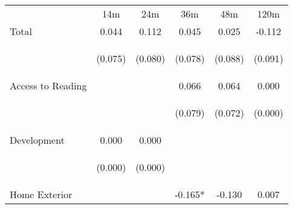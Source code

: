 \begin{tabular}{lccccc}
\hline \noalign{\smallskip} & 14m & 24m & 36m & 48m & 120m\\
\noalign{\smallskip}\hline \noalign{\smallskip}Total & 0.044 & 0.112 & 0.045 & 0.025 & -0.112\\
 & \begin{footnotesize}(0.075)\end{footnotesize} & \begin{footnotesize}(0.080)\end{footnotesize} & \begin{footnotesize}(0.078)\end{footnotesize} & \begin{footnotesize}(0.088)\end{footnotesize} & \begin{footnotesize}(0.091)\end{footnotesize}\\
\noalign{\smallskip}Access to Reading &  &  & 0.066 & 0.064 & 0.000\\
 & \begin{footnotesize}\end{footnotesize} & \begin{footnotesize}\end{footnotesize} & \begin{footnotesize}(0.079)\end{footnotesize} & \begin{footnotesize}(0.072)\end{footnotesize} & \begin{footnotesize}(0.000)\end{footnotesize}\\
\noalign{\smallskip}Development & 0.000 & 0.000 &  &  & \\
 & \begin{footnotesize}(0.000)\end{footnotesize} & \begin{footnotesize}(0.000)\end{footnotesize} & \begin{footnotesize}\end{footnotesize} & \begin{footnotesize}\end{footnotesize} & \begin{footnotesize}\end{footnotesize}\\
\noalign{\smallskip}Home Exterior &  &  & -0.165* & -0.130 & 0.007\\

\end{tabular}
